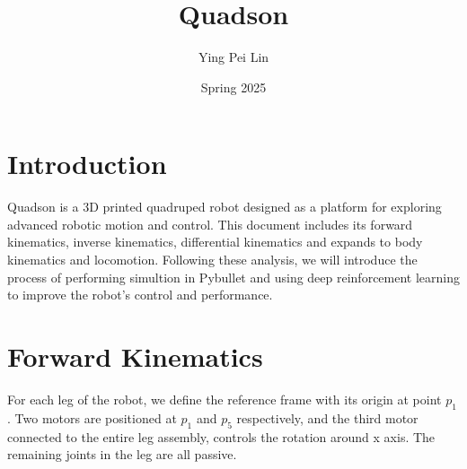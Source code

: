 \documentclass[a4paper,11pt]{article}
\begin{document}
	
\title{
	\textbf{Quadson}
}
\author{Ying Pei Lin}
\date{Spring 2025}
\maketitle

\section*{Introduction}

Quadson is a 3D printed quadruped robot designed as a platform for exploring advanced robotic motion and control.
This document includes its forward kinematics, inverse kinematics, differential kinematics and expands to body kinematics and locomotion.
Following these analysis, we will introduce the process of performing simultion in Pybullet and using deep
reinforcement learning to improve the robot's control and performance.

\section*{Forward Kinematics}

For each leg of the robot, we define the reference frame with its origin at point $p_1$. 
Two motors are positioned at $p_1$ and $p_5$ respectively, and the third motor
connected to the entire leg assembly, controls the rotation around x axis. The remaining joints in the leg are all passive.
\end{document}
